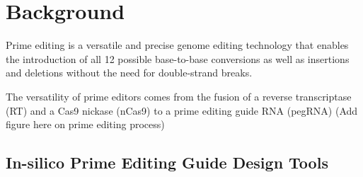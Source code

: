 \section{Background}

Prime editing is a versatile and precise genome editing technology that enables the introduction of all 12 possible base-to-base conversions as well as insertions and deletions without the need for double-strand breaks\cite{liudavidr.SearchandreplaceGenomeEditing2019}. 

The versatility of prime editors comes from the fusion of a reverse transcriptase (RT) and a Cas9 nickase (nCas9) to a prime editing guide RNA (pegRNA) (Add figure here on prime editing process)

\subsection*{In-silico Prime Editing Guide Design Tools}

